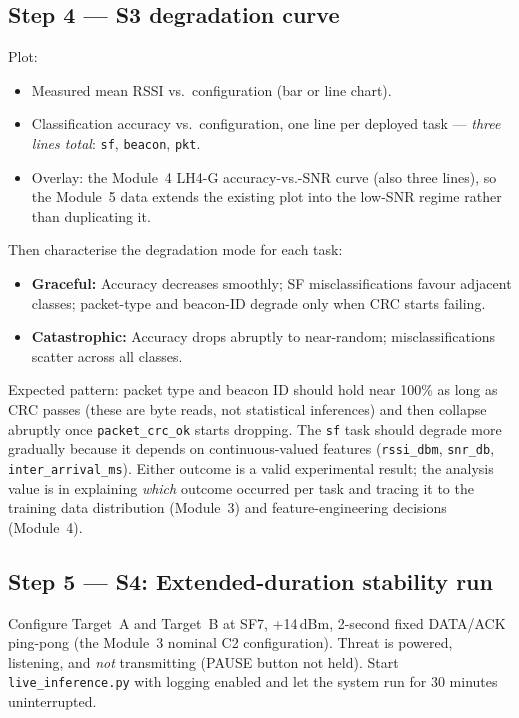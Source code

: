 \documentclass[11pt,letterpaper]{article}
\begin{document}
\subsection{Step 4 --- S3 degradation curve}
Plot:
\begin{itemize}[leftmargin=2em]
	\item Measured mean \mbox{RSSI} vs.\ configuration (bar or line chart).
	\item Classification accuracy vs.\ configuration, one line per deployed task --- \emph{three lines total}: \texttt{sf}, \texttt{beacon}, \texttt{pkt}.
	\item Overlay: the Module~4 LH4-G accuracy-vs.-\mbox{SNR} curve (also three lines), so the Module~5 data extends the existing plot into the low-\mbox{SNR} regime rather than duplicating it.
\end{itemize}

Then characterise the degradation mode for each task:
\begin{itemize}[leftmargin=2em]
	\item \textbf{Graceful:} Accuracy decreases smoothly; SF misclassifications favour adjacent classes; packet-type and beacon-ID degrade only when CRC starts failing.
	\item \textbf{Catastrophic:} Accuracy drops abruptly to near-random; misclassifications scatter across all classes.
\end{itemize}

Expected pattern: packet type and beacon ID should hold near 100\% as long as CRC passes (these are byte reads, not statistical inferences) and then collapse abruptly once \texttt{packet\_crc\_ok} starts dropping. The \texttt{sf} task should degrade more gradually because it depends on continuous-valued features (\texttt{rssi\_dbm}, \texttt{snr\_db}, \texttt{inter\_arrival\_ms}). Either outcome is a valid experimental result; the analysis value is in explaining \emph{which} outcome occurred per task and tracing it to the training data distribution (Module~3) and feature-engineering decisions (Module~4).

\subsection{Step 5 --- S4: Extended-duration stability run}
Configure Target~A and Target~B at SF7, +14\,dBm, 2-second fixed DATA/ACK ping-pong (the Module~3 nominal C2 configuration). Threat is powered, listening, and \emph{not} transmitting (PAUSE button not held). Start \texttt{live\_inference.py} with logging enabled and let the system run for 30 minutes uninterrupted.
\end{document}

